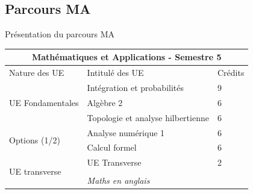 \documentclass{beamer}
\begin{document}
\subsection{Parcours MA }
 \begin{frame}{Présentation du parcours MA }
 \begin{tabular}{|l|l|l|}
  \hline
  \multicolumn{3}{|c|}{{\bf Mathématiques et Applications - Semestre 5}} \\
  \hline
    Nature des UE& Intitulé des UE & Crédits  \\
  \hline
  \multirow{3}{*}{UE Fondamentales} & {\color{mypink1}Intégration et probabilités} &9  \\
                                                            & {\color{mypink1}Algèbre 2}&6  \\
                                                            & Topologie et analyse hilbertienne&6  \\
     \hline
      \multirow{2}{*}{Options (1/2)} & Analyse numérique 1 &6  \\
                                                            & Calcul formel&6  \\
     \hline
 \multirow{4}{*}{UE transverse} & {\color{mypink1}UE Transverse }  &2  \\
                                                            & \hspace{2.5cm}{\it {\color{mypink1} Anglais}} &  \\
                                                            & \hspace{2.3cm} {\em {\color{mypink1} Maths en anglais}} &  \\
     \hline

\end{tabular}


 \end{frame}

\end{document}
